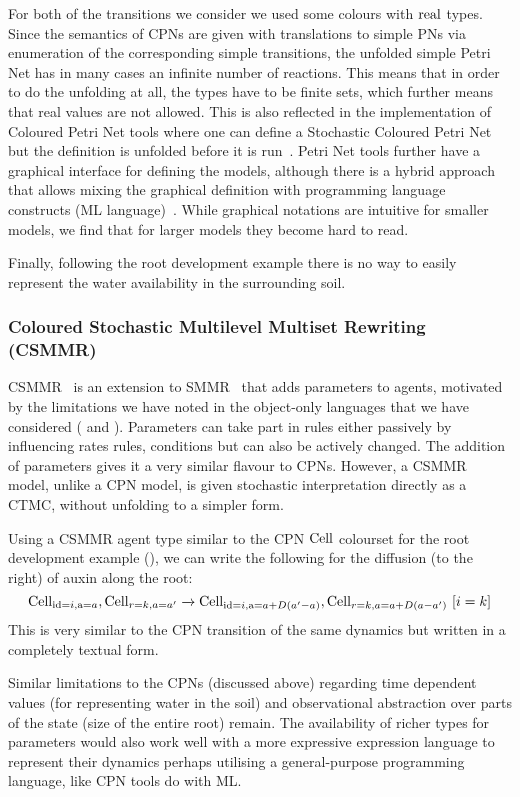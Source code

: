 For both of the transitions we consider we used some colours with $\mathrm{real}$
types. Since the semantics of CPNs are given with translations to simple PNs via
enumeration of the corresponding simple transitions, the unfolded simple Petri
Net has in many cases an infinite number of reactions. This means that in order
to do the unfolding at all, the types have to be finite sets, which further
means that real values are not allowed. This is also reflected in the
implementation of Coloured Petri Net tools where one can define a Stochastic
Coloured Petri Net but the definition is unfolded before it is
run~\citep{heiner_snoopyunifying_2012}. Petri Net tools further have a graphical
interface for defining the models, although there is a hybrid approach that
allows mixing the graphical definition with programming language constructs (ML
language)~\cite{jensen_coloured_1987}. While graphical notations are intuitive
for smaller models, we find that for larger models they become hard to read.

Finally, following the root development example there is no way to easily
represent the water availability in the surrounding soil.

\subsubsection*{Coloured Stochastic Multilevel Multiset Rewriting (CSMMR)}
CSMMR~\citep{oury_coloured_2011} is an extension to
SMMR~\citep{oury_multi-level_2013} that adds parameters to agents, motivated by
the limitations we have noted in the object-only languages that we have
considered ( and ). Parameters can take
part in rules either passively by influencing rates rules, conditions
but can also be actively changed. The addition of parameters gives it a very
similar flavour to CPNs. However, a CSMMR model, unlike a CPN model, is given
stochastic interpretation directly as a CTMC, without unfolding to a simpler
form.

Using a CSMMR agent type similar to the CPN $\mathrm{Cell}$ colourset for the root
development example (), we can write the following
for the diffusion (to the right) of auxin along the root:
$$
\mathrm{Cell}_{\mathrm{id}=i, \mathrm{a}=a}, \mathrm{Cell}_{r=k, a=a'} \xrightarrow{}
\mathrm{Cell}_{\mathrm{id}=i, \mathrm{a}=a+D(a'-a)}, \mathrm{Cell}_{r=k, a=a+D(a-a')} \, \,
[i=k]
$$
This is very similar to the CPN transition of the same dynamics but written in a
completely textual form.

Similar limitations to the CPNs (discussed above) regarding time dependent
values (\eg for representing water in the soil) and observational abstraction
over parts of the state (\eg size of the entire root) remain. The availability
of richer types for parameters would also work well with a more expressive
expression language to represent their dynamics perhaps utilising a
general-purpose programming language, like CPN tools do with ML.

